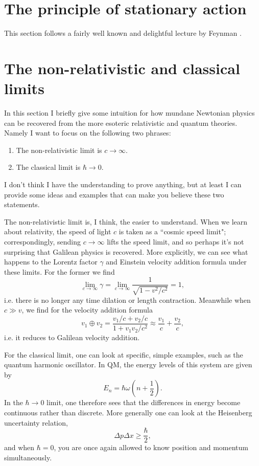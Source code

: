 \section{The principle of stationary action}


This section follows a fairly well known and delightful lecture by Feynman
\cite{caltech}.

\section{The non-relativistic and classical limits}

In this section I briefly give some intuition for how mundane Newtonian
physics can be recovered from the more esoteric relativistic and quantum
theories. Namely  I want to focus on 
the following two phrases:
\begin{enumerate}
  \item The non-relativistic limit is $c\to\infty$.
  \item The classical limit is $\hbar\to0$.
\end{enumerate}
I don't think I have the understanding to prove anything, but at least I
can provide some ideas and examples that can make you believe these
two statements.

The non-relativistic limit is, I think, the easier to understand. When we
learn about relativity, the speed of light $c$ is taken as a ``cosmic speed
limit"; correspondingly, sending $c\to\infty$ lifts the speed limit, and
so perhaps it's not surprising that Galilean physics is recovered.
More explicitly, we can see what happens to the Lorentz factor $\gamma$ and
Einstein velocity addition formula under these limits. For the former
we find
\begin{equation}
  \lim_{c\to\infty}\gamma
  =\lim_{c\to\infty}\frac{1}{\sqrt{1-v^2/c^2}}=1,
\end{equation}
i.e. there is no longer any time dilation or length contraction.
Meanwhile when $c\gg v$, we find for the velocity addition formula 
\begin{equation}
  v_1\oplus v_2
  =\frac{v_1/c + v_2/c}{1+v_1v_2/c^2}
  \approx \frac{v_1}{c} + \frac{v_2}{c}, 
\end{equation}
i.e. it reduces to Galilean velocity addition.

For the classical limit, one can look at specific, simple examples, such as
the quantum harmonic oscillator. In QM, the energy levels of this system
are given by
\begin{equation}
  E_n=\hbar\omega\left(n+\frac{1}{2}\right).
\end{equation}
In the $\hbar\to0$ limit, one therefore sees that the differences in energy
become continuous rather than discrete. More generally one can look at
the Heisenberg uncertainty relation,
\begin{equation}
  \Delta p\Delta x\geq \frac{\hbar}{2},
\end{equation}
and when $\hbar=0$, you are once again allowed to know position and
momentum simultaneously.

